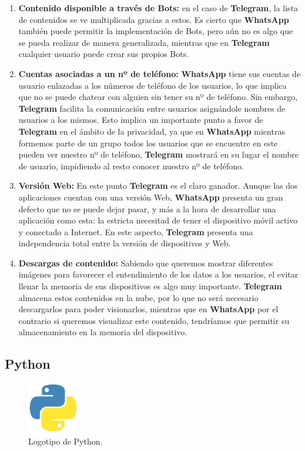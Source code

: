 \begin{enumerate}
	\item \textbf{Contenido disponible a través de Bots:} en el caso de \textbf{Telegram}, la lista de contenidos se ve multiplicada gracias a estos. Es cierto que \textbf{WhatsApp} también puede permitir la implementación de Bots, pero aún no es algo que se pueda realizar de manera generalizada, mientras que en \textbf{Telegram} cualquier usuario puede crear sus propios Bots.
	\item \textbf{Cuentas asociadas a un nº de teléfono:} \textbf{WhatsApp} tiene sus cuentas de usuario enlazadas a los números de teléfono de los usuarios, lo que implica que no se puede chatear con alguien sin tener su nº de teléfono. Sin embargo, \textbf{Telegram} facilita la comunicación entre usuarios asignándole nombres de usuarios a los mismos. Esto implica un importante punto a favor de \textbf{Telegram} en el ámbito de la privacidad, ya que en \textbf{WhatsApp} mientras formemos parte de un grupo todos los usuarios que se encuentre en este pueden ver nuestro nº de teléfono, \textbf{Telegram} mostrará en su lugar el nombre de usuario, impidiendo al resto conocer nuestro nº de teléfono.
	\item \textbf{Versión Web:} En este punto \textbf{Telegram} es el claro ganador. Aunque las dos aplicaciones cuentan con una versión Web, \textbf{WhatsApp} presenta un gran defecto que no se puede dejar pasar, y más a la hora de desarrollar una aplicación como esta: la estricta necesitad de tener el dispositivo móvil activo y conectado a Internet. En este aspecto, \textbf{Telegram} presenta una independencia total entre la versión de dispositivos y Web.
	\item \textbf{Descargas de contenido:} Sabiendo que queremos mostrar diferentes imágenes para favorecer el entendimiento de los datos a los usuarios, el evitar llenar la memoria de sus dispositivos es algo muy importante. \textbf{Telegram} almacena estos contenidos en la nube, por lo que no será necesario descargarlos para poder visionarlos, mientras que en \textbf{WhatsApp} por el contrario si queremos visualizar este contenido, tendríamos que permitir su almacenamiento en la memoria del dispositivo.
\end{enumerate}

\subsection{Python}

\begin{figure}[H]
	\centering
	\includegraphics[width=0.2\textwidth]{img/python-icon}
	\caption{Logotipo de Python.}
\end{figure}

